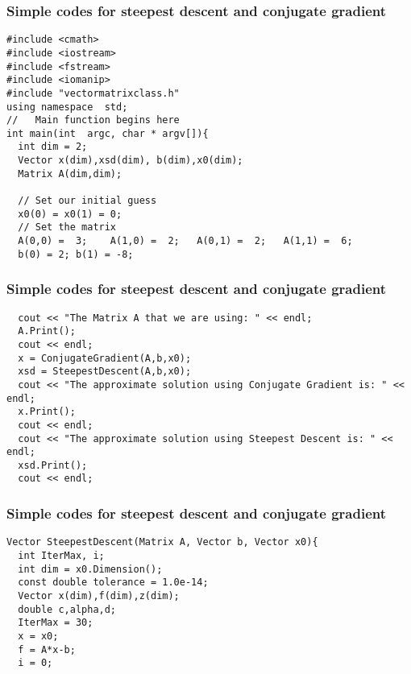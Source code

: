\documentclass{beamer}
\begin{document}
\begin{frame}
\frametitle{Simple codes for  steepest descent and conjugate gradient}

\begin{block}{}
\begin{verbatim}
#include <cmath>
#include <iostream>
#include <fstream>
#include <iomanip>
#include "vectormatrixclass.h"
using namespace  std;
//   Main function begins here
int main(int  argc, char * argv[]){
  int dim = 2;
  Vector x(dim),xsd(dim), b(dim),x0(dim);
  Matrix A(dim,dim);
  
  // Set our initial guess
  x0(0) = x0(1) = 0;
  // Set the matrix  
  A(0,0) =  3;    A(1,0) =  2;   A(0,1) =  2;   A(1,1) =  6; 
  b(0) = 2; b(1) = -8;
\end{verbatim}
\end{block}
\end{frame}

\begin{frame}
\frametitle{Simple codes for  steepest descent and conjugate gradient}

\begin{block}{}
\begin{verbatim}
  cout << "The Matrix A that we are using: " << endl;
  A.Print();
  cout << endl;
  x = ConjugateGradient(A,b,x0);
  xsd = SteepestDescent(A,b,x0);
  cout << "The approximate solution using Conjugate Gradient is: " << endl;
  x.Print();
  cout << endl;
  cout << "The approximate solution using Steepest Descent is: " << endl;
  xsd.Print();
  cout << endl;
\end{verbatim}
\end{block}
\end{frame}

\begin{frame}
\frametitle{Simple codes for  steepest descent and conjugate gradient}

\begin{block}{}
\begin{verbatim}
Vector SteepestDescent(Matrix A, Vector b, Vector x0){
  int IterMax, i;
  int dim = x0.Dimension();
  const double tolerance = 1.0e-14;
  Vector x(dim),f(dim),z(dim);
  double c,alpha,d;
  IterMax = 30;
  x = x0;
  f = A*x-b;
  i = 0;
\end{verbatim}
\end{block}
\end{frame}
\end{document}
